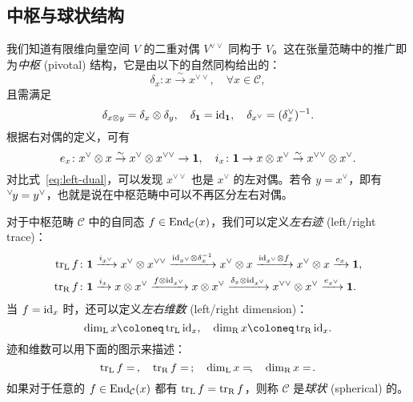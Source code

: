 \subsection{中枢与球状结构}

我们知道有限维向量空间 $V$ 的二重对偶 $V^{\vee\vee}$ 同构于 $V$。这在张量范畴中的推广即为\emph{中枢} (pivotal) 结构，它是由以下的自然同构给出的：
\begin{equation}
  \delta_x \colon x \overset\sim\to x^{\vee\vee}, \quad \forall x\in\mathcal{C},
\end{equation}
且需满足
\begin{equation}
  \delta_{x\otimes y} = \delta_x\otimes\delta_y, \quad
  \delta_{\mathbf{1}} = \mathrm{id}_{\mathbf{1}}, \quad
  \delta_{x^\vee} = (\delta_x^\vee)^{-1}.
\end{equation}
根据右对偶的定义，可有
\begin{equation}
  e_x\colon x^\vee\otimes x \overset\sim\to x^\vee\otimes x^{\vee\vee}\to\mathbf{1}, \quad
  i_x\colon \mathbf{1}\to x\otimes x^\vee \overset\sim\to x^{\vee\vee}\otimes x^\vee.
\end{equation}
对比式~\eqref{eq:left-dual}，可以发现 $x^{\vee\vee}$ 也是 $x^\vee$ 的左对偶。若令 $y=x^\vee$，即有 ${}^\vee\mspace{-2mu}y=y^\vee$，也就是说在中枢范畴中可以不再区分左右对偶。

对于中枢范畴 $\mathcal{C}$ 中的自同态 $f\in\operatorname{End}_{\mathcal{C}}(x)$，我们可以定义\emph{左右迹} (left/right trace)：
\begin{equation}
  \begin{aligned}
    \operatorname{tr}_{\text{L}} f &\colon \mathbf{1} \xrightarrow{i_{x^\vee}} x^\vee\otimes x^{\vee\vee}
                                \xrightarrow{\mathrm{id}_{x^\vee}\otimes\delta_x^{-1}} x^\vee\otimes x
                                \xrightarrow{\mathrm{id}_{x^\vee}\otimes f} x^\vee\otimes x
                                \xrightarrow{e_x} \mathbf{1}, \\
    \operatorname{tr}_{\text{R}} f &\colon \mathbf{1} \xrightarrow{i_x} x\otimes x^\vee
                                \xrightarrow{f\otimes\mathrm{id}_{x^\vee}} x\otimes x^\vee
                                \xrightarrow{\delta_x\otimes\mathrm{id}_{x^\vee}} x^{\vee\vee}\otimes x^\vee
                                \xrightarrow{e_{x^\vee}} \mathbf{1}.
  \end{aligned}
\end{equation}
当 $f=\mathrm{id}_x$ 时，还可以定义\emph{左右维数} (left/right dimension)：
\begin{equation}
  \dim_{\text{L}} x \coloneq \tr_{\text{L}}\id_x, \quad
  \dim_{\text{R}} x \coloneq \tr_{\text{R}}\id_x.
\end{equation}
迹和维数可以用下面的图示来描述：
\begin{equation}
  \operatorname{tr}_{\text{L}}  f =  \, , \quad
  \operatorname{tr}_{\text{R}}  f =  \, ; \quad
  \dim_{\text{L}} x =  \!, \quad
  \dim_{\text{R}} x =  \!.
\end{equation}
如果对于任意的 $f\in\operatorname{End}_{\mathcal{C}}(x)$ 都有 $\operatorname{tr}_{\text{L}}f=\operatorname{tr}_{\text{R}}f$，则称 $\mathcal{C}$ 是\emph{球状} (spherical) 的。

